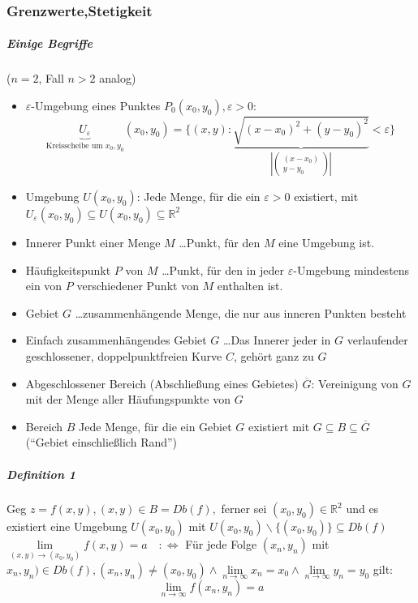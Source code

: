 \documentclass[a4paper]{scrartcl}
\begin{document}
\subsubsection{Grenzwerte,Stetigkeit}
\subparagraph{Einige Begriffe} ($n=2$, Fall $n>2$ analog)
\begin{itemize}
\item $\varepsilon$-Umgebung eines Punktes $P_0(x_0,y_0), \varepsilon > 0$:
\[\underbrace{U_\varepsilon}_{\text{Kreisscheibe um } x_0,y_0} (x_0,y_0) = \{ (x,y): \underbrace{\sqrt{(x-x_0)^2 + (y-y_0)^2}}_{\left \lvert \begin{pmatrix} (x-x_0)\\ y-y_0 \end{pmatrix} \right \rvert} < \varepsilon\}\]
\item Umgebung $U(x_0,y_0)$: Jede Menge, für die ein $\varepsilon > 0$ existiert, mit $U_\varepsilon (x_0,y_0) \subseteq U(x_0,y_0) \subseteq \mathbb{R}^2$
\item Innerer Punkt einer Menge $M$ \dots Punkt, für den $M$ eine Umgebung ist.
\item Häufigkeitspunkt $P$ von $M$ \dots Punkt, für den in jeder $\varepsilon$-Umgebung mindestens ein von $P$ verschiedener Punkt von $M$ enthalten ist.
\item Gebiet $G$ \dots zusammenhängende Menge, die nur aus inneren Punkten besteht
\item Einfach zusammenhängendes Gebiet $G$ \dots Das Innerer jeder in $G$ verlaufender geschlossener, doppelpunktfreien Kurve $C$, gehört ganz zu $G$
\item Abgeschlossener Bereich (Abschließung eines Gebietes) $\overline{G}$: Vereinigung von $G$ mit der Menge aller Häufungspunkte von $G$
\item Bereich $B$ Jede Menge, für die ein Gebiet $G$ existiert mit $G \subseteq B \subseteq \overline{G}$ ("`Gebiet einschließlich Rand"')
\end{itemize}

\subparagraph{Definition 1} Geg $z=f(x,y), (x,y) \in B = Db(f),$ ferner sei $(x_0,y_0) \in \mathbb{R}^2$ und es existiert eine Umgebung $U(x_0,y_0)$ mit $U(x_0,y_0) \backslash \{ (x_0,y_0) \} \subseteq Db(f)$\\
$\lim\limits_{(x,y) \to (x_0,y_0)} f(x,y) =a \quad : \Leftrightarrow$ Für jede Folge $(x_n,y_n)$ mit $x_n,y_n) \in Db(f), (x_n,y_n) \neq (x_0,y_0) \wedge \lim\limits_{n \to \infty} x_n = x_0 \wedge \lim\limits_{n \to \infty} y_n = y_0$ gilt: 
\begin{equation}\label{5121}
\lim\limits_{n \to \infty} f(x_n,y_n) = a
\end{equation}
\end{document}
